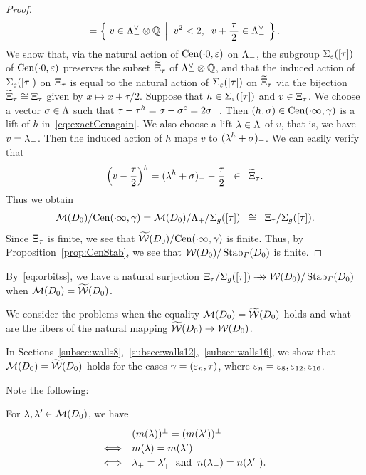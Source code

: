 \documentclass{amsart} %
\begin{document}
\begin{proof}
\begin{equation}
=\left\{\; {v\in \Lambda_{-}^{\vee}\otimes\mathord{\mathbb{Q}}} \; \left\vert \; {\;v^2<2, \;\; v+\dfrac{\tau}{\,2\,}\in \Lambda_{-}^{\vee}} \; \right.\right \}.
\end{equation}
%
We show that, via the natural action of $\mathrm{Cen}(\cdot 0, \varepsilon)$ on $\Lambda_{-}$,
the subgroup 
$\Sigma_{\varepsilon}([\tau])$ of $\mathrm{Cen}(\cdot 0, \varepsilon)$
preserves the subset $\widetilde{\Xi}_{\tau}$ of $\Lambda_{-}^{\vee}\otimes\mathord{\mathbb{Q}}$,
and that 
the induced action of 
$\Sigma_{\varepsilon}([\tau])$ on $\Xi_{\tau}$
is equal to the natural action of $\Sigma_{\varepsilon}([\tau])$ on $\widetilde{\Xi}_{\tau}$
via the 
bijection $\widetilde{\Xi}_{\tau}\cong \Xi_{\tau}$ given by 
$x\mapsto x+\tau/2$.
Suppose that $h\in \Sigma_{\varepsilon}([\tau])$ and $v\in \Xi_{\tau}$.
We choose a vector $\sigma\in \Lambda$ such that $\tau-\tau^h=\sigma-\sigma^\varepsilon=2\sigma_{-}$.
Then $(h, \sigma)\in \mathrm{Cen}(\cdot \infty, \gamma)$ is a lift of $h$ in~\eqref{eq:exactCenagain}.
We also choose a lift $\lambda\in \Lambda$ of $v$,
that is, we have $v=\lambda\sb{-}$.
Then the induced action of $h$ maps $v$ to $(\lambda^h+\sigma)\sb{-}$.
We can easily verify that
\[
\left(v-\dfrac{\tau}{2}\right)^h=(\lambda^h+\sigma)_{-}-\dfrac{\tau}{2}\;\;\in\;\;\widetilde{\Xi}_{\tau}.
\]
 Thus we obtain 
%
\begin{equation}\label{eq:orbitss}
 \MMM(D_0)/\Cen(\dotinf, \gamma)= \MMM(D_0)/\Leechplus/\Sigma_{g}([\tau])\;\;\cong\;\; \Xitau/\Sigma_{g}([\tau]). %
\end{equation}
%
Since $\Xi_{\tau}$ is finite, 
 we see that
$\widetilde{\mathord{\mathcal{W}}}(D_0)/\mathrm{Cen}(\cdot \infty, \gamma)$ is finite.
Thus, by Proposition~\ref{prop:CenStab},
we see that $\mathord{\mathcal{W}}(D_0)/\operatorname{Stab}_{\varGamma}(D_0)$ is finite. 
%
\end{proof}
%
\begin{remark}\label{rem:orbitss}
By~\eqref{eq:orbitss},
we have 
a natural surjection 
$ \Xi_{\tau}/\Sigma_{g}([\tau]) \mathrel{\rightarrow\!\!\!\!\rightarrow} \mathord{\mathcal{W}}(D_0)/\operatorname{Stab}_{\varGamma}(D_0)$
when $ \mathord{\mathcal{M}}(D_0)=\widetilde{\mathord{\mathcal{W}}}(D_0)$.
\end{remark}
%
We consider the problems when 
the equality $\mathord{\mathcal{M}}(D_0)=\widetilde{\mathord{\mathcal{W}}} (D_0)$ holds and 
what are the fibers of the natural mapping $\widetilde{\mathord{\mathcal{W}}} (D_0)\to \mathord{\mathcal{W}}(D_0)$.
%
\begin{remark}
In Sections~\ref{subsec:walls8},~\ref{subsec:walls12},~\ref{subsec:walls16}, 
we show that $\mathord{\mathcal{M}}(D_0)=\widetilde{\mathord{\mathcal{W}}} (D_0)$ holds
for the cases $\gamma=(\varepsilon_n, \tau)$,
where $\varepsilon_n=\varepsilon_8, \varepsilon_{12}, \varepsilon_{16}$.
\end{remark}
%
Note the following:
%
\begin{lemma}\label{lem:mmequal}
For $\lambda, \lambda^{\prime}\in \mathord{\mathcal{M}}(D_0)$, we have 
\[
\renewcommand{\arraystretch}{1.2}
\begin{array}{cl}
&(m(\lambda))\sperp=(m(\lambda\sprime))\sperp\\
\Longleftrightarrow & m(\lambda)=m(\lambda\sprime) \\
\Longleftrightarrow & \lambdaplus=\lambdaplus\sprime\;\;\textrm{and}\;\; 
n(\lambdaminus)=n(\lambdaminus\sprime).
\end{array}
\]
\end{lemma}
\end{document}
